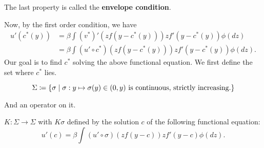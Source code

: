 \documentclass[12pt]{article}
\begin{document}
\begin{remark}
    The last property is called the \textbf{envelope condition}.
\end{remark}

Now, by the first order condition, we have 
\begin{equation}
    \begin{split}
        u'(c^*(y)) &= \beta\int (v^*)'(zf(y-c^*(y)))zf'(y-c^*(y))\phi(dz)\\
        &= \beta\int (u'\circ c^*)(zf(y-c^*(y)))zf'(y-c^*(y))\phi(dz).
    \end{split}
\end{equation}
Our goal is to find $c^*$ solving the above functional 
equation. We first define the set where $c^*$ lies. 
\begin{definition}
    \begin{equation}
        \Sigma \coloneqq \left\{ \sigma \;\middle\vert\; \sigma:y\mapsto \sigma(y)\in(0,y)
        \text{ is continuous, strictly increasing.} \right\}
    \end{equation}
\end{definition}
And an operator on it.
\begin{definition}
    $K: \Sigma \to \Sigma$ with $K\sigma$ defined by the solution $c$ of 
    the following functional equation:
    \begin{equation}
        u'(c) = \beta\int (u'\circ \sigma)(zf(y-c))zf'(y-c)\phi(dz).
    \end{equation}
\end{definition}
\end{document}
